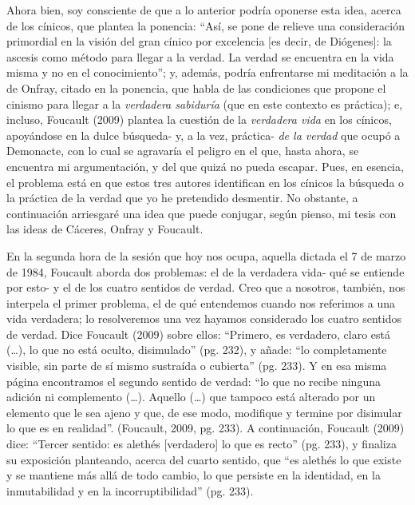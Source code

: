 \begin{refsection}
Ahora bien, soy consciente de que a lo anterior podría oponerse esta idea, acerca de los cínicos, que plantea la ponencia: ``Así, se pone de relieve una consideración primordial en la visión del gran cínico por excelencia {[}es decir, de Diógenes{]}: la ascesis como método para llegar a la verdad. La verdad se encuentra en la vida misma y no en el conocimiento''; y, además, podría enfrentarse mi meditación a la de Onfray, citado en la ponencia, que habla de las condiciones que propone el cinismo para llegar a la \emph{verdadera sabiduría} (que en este contexto es práctica); e, incluso, Foucault (2009) plantea la cuestión de la \emph{verdadera vida} en los cínicos, apoyándose en la dulce búsqueda- y, a la vez, práctica- \emph{de la verdad} que ocupó a Demonacte, con lo cual se agravaría el peligro en el que, hasta ahora, se encuentra mi argumentación, y del que quizá no pueda escapar. Pues, en esencia, el problema está en que estos tres autores identifican en los cínicos la búsqueda o la práctica de la verdad que yo he pretendido desmentir. No obstante, a continuación arriesgaré una idea que puede conjugar, según pienso, mi tesis con las ideas de Cáceres, Onfray y Foucault.

En la segunda hora de la sesión que hoy nos ocupa, aquella dictada el 7 de marzo de 1984, Foucault aborda dos problemas: el de la verdadera vida- qué se entiende por esto- y el de los cuatro sentidos de verdad. Creo que a nosotros, también, nos interpela el primer problema, el de qué entendemos cuando nos referimos a una vida verdadera; lo resolveremos una vez hayamos considerado los cuatro sentidos de verdad. Dice Foucault (2009) sobre ellos: ``Primero, es verdadero, claro está (\ldots{}), lo que no está oculto, disimulado'' (pg. 232), y añade: ``lo completamente visible, sin parte de sí mismo sustraída o cubierta'' (pg. 233). Y en esa misma página encontramos el segundo sentido de verdad: ``lo que no recibe ninguna adición ni complemento (\ldots{}). Aquello (\ldots{}) que tampoco está alterado por un elemento que le sea ajeno y que, de ese modo, modifique y termine por disimular lo que es en realidad''. (Foucault, 2009, pg. 233). A continuación, Foucault (2009) dice: ``Tercer sentido: es alethés {[}verdadero{]} lo que es recto'' (pg. 233), y finaliza su exposición planteando, acerca del cuarto sentido, que ``es alethés lo que existe y se mantiene más allá de todo cambio, lo que persiste en la identidad, en la inmutabilidad y en la incorruptibilidad'' (pg. 233).


\end{refsection}
